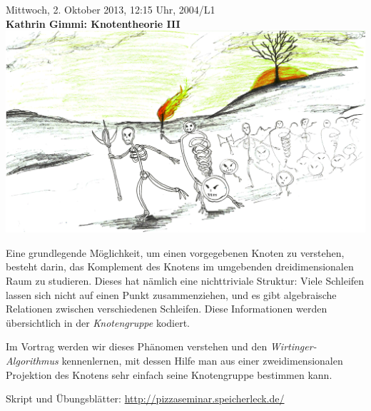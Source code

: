 \documentclass[a4paper,ngerman,landscape]{scrartcl}
\begin{document}
\begin{center}
  \huge
  Mittwoch, 2. Oktober 2013, 12:15 Uhr, 2004/L1 \\
  \textbf{Kathrin Gimmi: Knotentheorie III}
  \vfill
  \includegraphics[scale=0.6]{knotenarmee-duester-farbkorrigiert}
  \vfill

  \Large
  \begin{minipage}{0.94\textwidth}
    \setlength\parskip{\medskipamount}
    Eine grundlegende Möglichkeit, um einen vorgegebenen Knoten zu verstehen,
    besteht darin, das Komplement des Knotens im umgebenden dreidimensionalen
    Raum zu studieren. Dieses hat nämlich eine nichttriviale
    Struktur: Viele Schleifen lassen sich nicht auf einen Punkt zusammenziehen,
    und es gibt algebraische Relationen zwischen verschiedenen Schleifen. Diese
    Informationen werden übersichtlich in der \emph{Knotengruppe} kodiert.

    Im Vortrag werden wir dieses Phänomen verstehen und
    den \emph{Wirtinger-Algorithmus} kennenlernen, mit dessen Hilfe man aus einer
    zweidimensionalen Projektion des Knotens sehr einfach seine Knotengruppe
    bestimmen kann.
  \end{minipage}
\end{center}

\hfill\small Skript und Übungsblätter: \url{http://pizzaseminar.speicherleck.de/}
\end{document}

